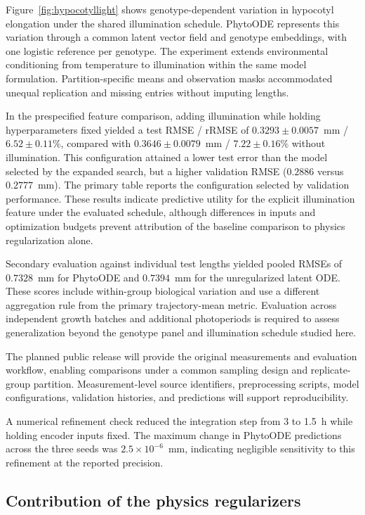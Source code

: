 \documentclass[preprint,12pt,authoryear]{elsarticle}
\begin{document}
Figure~\ref{fig:hypocotyllight} shows genotype-dependent variation in hypocotyl elongation under the shared illumination schedule. PhytoODE represents this variation through a common latent vector field and genotype embeddings, with one logistic reference per genotype. The experiment extends environmental conditioning from temperature to illumination within the same model formulation. Partition-specific means and observation masks accommodated unequal replication and missing entries without imputing lengths.

In the prespecified feature comparison, adding illumination while holding hyperparameters fixed yielded a test RMSE / rRMSE of $0.3293\pm0.0057$~mm / $6.52\pm0.11\%$, compared with $0.3646\pm0.0079$~mm / $7.22\pm0.16\%$ without illumination. This configuration attained a lower test error than the model selected by the expanded search, but a higher validation RMSE ($0.2886$ versus $0.2777$~mm). The primary table reports the configuration selected by validation performance. These results indicate predictive utility for the explicit illumination feature under the evaluated schedule, although differences in inputs and optimization budgets prevent attribution of the baseline comparison to physics regularization alone.

Secondary evaluation against individual test lengths yielded pooled RMSEs of $0.7328$~mm for PhytoODE and $0.7394$~mm for the unregularized latent ODE. These scores include within-group biological variation and use a different aggregation rule from the primary trajectory-mean metric. Evaluation across independent growth batches and additional photoperiods is required to assess generalization beyond the genotype panel and illumination schedule studied here.

The planned public release will provide the original measurements and evaluation workflow, enabling comparisons under a common sampling design and replicate-group partition. Measurement-level source identifiers, preprocessing scripts, model configurations, validation histories, and predictions will support reproducibility.

A numerical refinement check reduced the integration step from 3 to 1.5~h while holding encoder inputs fixed. The maximum change in PhytoODE predictions across the three seeds was $2.5\times10^{-6}$~mm, indicating negligible sensitivity to this refinement at the reported precision.

\FloatBarrier


\subsection{Contribution of the physics regularizers}
\label{subsec:physicsablationresults}
\end{document}
